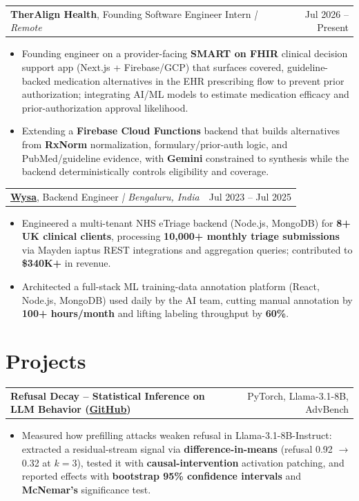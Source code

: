 \documentclass[letterpaper,11pt]{article}
\makeatletter
\newcommand{\expItem}[4]{%
  \vspace{2pt}
  \begin{tabular*}{\textwidth}{@{}l@{\extracolsep{\fill}}r@{}}
    \textbf{#1}, #2 \textit{| #3} & #4 \\
  \end{tabular*}\par\vspace{-3pt}
}
\newcommand{\projItem}[2]{%
  \vspace{2pt}
  \begin{tabular*}{\textwidth}{@{}l@{\extracolsep{\fill}}r@{}}
    \textbf{#1} & #2 \\
  \end{tabular*}\par\vspace{-3pt}
}
\makeatother
\begin{document}
\expItem{TherAlign Health}{Founding Software Engineer Intern}{Remote}{Jul 2026 -- Present}
\begin{itemize}
  \item Founding engineer on a provider-facing \textbf{SMART on FHIR} clinical decision support app (Next.js + Firebase/GCP) that surfaces covered, guideline-backed medication alternatives in the EHR prescribing flow to prevent prior authorization; integrating AI/ML models to estimate medication efficacy and prior-authorization approval likelihood.
  \item Extending a \textbf{Firebase Cloud Functions} backend that builds alternatives from \textbf{RxNorm} normalization, formulary/prior-auth logic, and PubMed/guideline evidence, with \textbf{Gemini} constrained to synthesis while the backend deterministically controls eligibility and coverage.
\end{itemize}

\expItem{\href{https://www.wysa.io}{Wysa}}{Backend Engineer}{Bengaluru, India}{Jul 2023 -- Jul 2025}
\begin{itemize}
  \item Engineered a multi-tenant NHS eTriage backend (Node.js, MongoDB) for \textbf{8+ UK clinical clients}, processing \textbf{10{,}000+ monthly triage submissions} via Mayden iaptus REST integrations and aggregation queries; contributed to \textbf{\$340K+} in revenue.
  \item Architected a full-stack ML training-data annotation platform (React, Node.js, MongoDB) used daily by the AI team, cutting manual annotation by \textbf{100+ hours/month} and lifting labeling throughput by \textbf{60\%}.
\end{itemize}

\section{Projects}

\projItem{Refusal Decay -- Statistical Inference on LLM Behavior {\normalfont\small(\href{https://github.com/Deva-1903/refusal-decay}{GitHub})}}{PyTorch, Llama-3.1-8B, AdvBench}
\begin{itemize}
  \item Measured how prefilling attacks weaken refusal in Llama-3.1-8B-Instruct: extracted a residual-stream signal via \textbf{difference-in-means} (refusal 0.92 $\to$ 0.32 at $k{=}3$), tested it with \textbf{causal-intervention} activation patching, and reported effects with \textbf{bootstrap 95\% confidence intervals} and \textbf{McNemar's} significance test.
\end{itemize}
\end{document}
